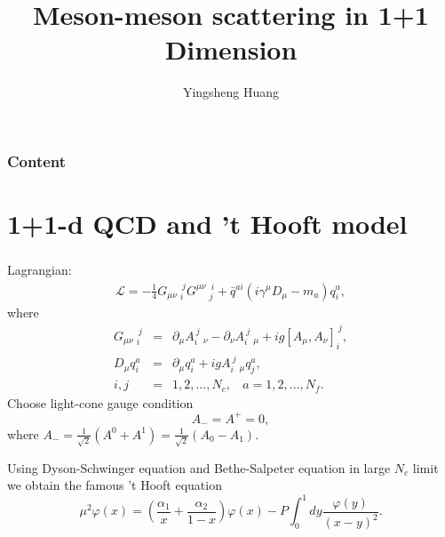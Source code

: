 \documentclass[8pt]{beamer}
\title{Meson-meson scattering in 1+1 Dimension%
}
\author{Yingsheng Huang}
\institute{Institute of High Energy Physics
}
\begin{document}
\maketitle
\begin{frame}
	\frametitle{Content}
	\tableofcontents


\end{frame}

\section{1+1-d QCD and 't Hooft model }
\begin{frame}
	\frametitle{\insertsectionhead}
	Lagrangian:
	\begin{eqnarray}
		\mathcal{L}=-\frac{1}{4}G_{\mu\nu}\ _{i}^{\ j}G^{\mu\nu}\ _{j}^{\
		i}+\bar q^{a i}(i\gamma^\mu D_\mu-m_a)q_i^a,
	\end{eqnarray}
	where
	\begin{eqnarray}
		G_{\mu\nu}\ _{i}^{\ j}&=&\partial_{\mu} A_{i}^{\ j}\
		_{\nu}-\partial_\nu A_{i}^{\ j}\ _{\mu}+i g[A_\mu,A_\nu]_{i}^{\
				j},\nonumber\\
		D_\mu q_i^a&=&\partial_\mu q_i^a+ig A_i^{\ j}\ _\mu q_j^a,\nonumber\\
		i,j&=&1,2,...,N_c, \ \ \ \ a=1,2,...,N_f.
	\end{eqnarray}
	Choose light-cone gauge condition
	\begin{equation}
		A_{-}=A^{+}=0,
	\end{equation}
	where
	$A_{-}=\frac{1}{\sqrt{2}}(A^0+A^1)=\frac{1}{\sqrt{2}}(A_0-A_1)$.

	Using Dyson-Schwinger equation and Bethe-Salpeter equation in large $N_c$ limit we obtain the famous 't Hooft equation
	\begin{equation}
		\mu^2
		\varphi(x)=(\frac{\alpha_{1}}{x}+\frac{\alpha_{2}}{1-x})\varphi(x)-P\int_0^1
		dy\frac{\varphi(y)}{(x-y)^2}.\label{teq}
	\end{equation}
\end{frame}
\end{document}
